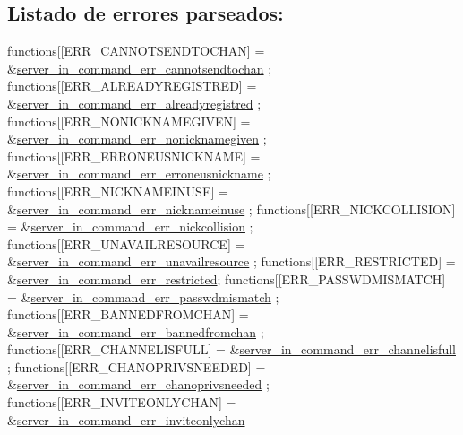 \subsection*{Listado de errores parseados\+:}


\begin{DoxyCode}
functions[[ERR\_CANNOTSENDTOCHAN]       = &\hyperlink{G-2313-06-P2__client__err__handlers_8h_aee5973ae831d1c7c63b1a62b59f561c2}{server\_in\_command\_err\_cannotsendtochan}
      ;
functions[[ERR\_ALREADYREGISTRED]       = &\hyperlink{G-2313-06-P2__client__err__handlers_8h_a14bfb17eb95d0f2bef1869aa2ebf520c}{server\_in\_command\_err\_alreadyregistred}
      ;
functions[[ERR\_NONICKNAMEGIVEN]        = &\hyperlink{G-2313-06-P2__client__err__handlers_8h_aaa9cfb1b5050bd1218c227d8d0a041fe}{server\_in\_command\_err\_nonicknamegiven}
      ;
functions[[ERR\_ERRONEUSNICKNAME]       = &\hyperlink{G-2313-06-P2__client__err__handlers_8h_abeb8ead21ebba982eb59f161eda735cb}{server\_in\_command\_err\_erroneusnickname}
      ;
functions[[ERR\_NICKNAMEINUSE]          = &\hyperlink{G-2313-06-P2__client__err__handlers_8h_ab6d8f2d05566bf6ee9dfcfc4a20f5d23}{server\_in\_command\_err\_nicknameinuse}
      ;
functions[[ERR\_NICKCOLLISION]          = &\hyperlink{G-2313-06-P2__client__err__handlers_8h_a4af95b292b293c08c0989b4e7334c7eb}{server\_in\_command\_err\_nickcollision}
      ;
functions[[ERR\_UNAVAILRESOURCE]        = &\hyperlink{G-2313-06-P2__client__err__handlers_8h_ae4fcb567dc7685f5d7a4abbc7c6506b4}{server\_in\_command\_err\_unavailresource}
      ;
functions[[ERR\_RESTRICTED]             = &\hyperlink{G-2313-06-P2__client__err__handlers_8h_ada432444f58d5effbb05fd558a8ce289}{server\_in\_command\_err\_restricted};
functions[[ERR\_PASSWDMISMATCH]         = &\hyperlink{G-2313-06-P2__client__err__handlers_8h_a548a7ad35236521dca4b829e466f3379}{server\_in\_command\_err\_passwdmismatch}
      ;
functions[[ERR\_BANNEDFROMCHAN]         = &\hyperlink{G-2313-06-P2__client__err__handlers_8h_a0e4059ef132eaac2218fdd89b20ca852}{server\_in\_command\_err\_bannedfromchan}
      ;
functions[[ERR\_CHANNELISFULL]          = &\hyperlink{G-2313-06-P2__client__err__handlers_8h_a05db0aa32f2ec2925cba3b952435bf59}{server\_in\_command\_err\_channelisfull}
      ;
functions[[ERR\_CHANOPRIVSNEEDED]       = &\hyperlink{G-2313-06-P2__client__err__handlers_8h_a9fcb3f66fbcc994c7a78b36ebc0fe63d}{server\_in\_command\_err\_chanoprivsneeded}
      ;
functions[[ERR\_INVITEONLYCHAN]         = &\hyperlink{G-2313-06-P2__client__err__handlers_8h_ae5512c3dd8e1584fd8bafc4f5dd15d8c}{server\_in\_command\_err\_inviteonlychan}

\end{DoxyCode}

